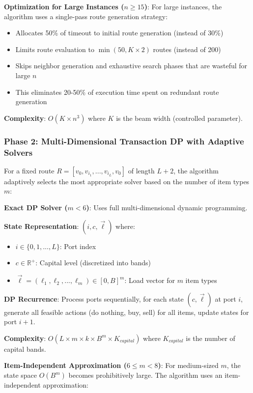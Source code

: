 \documentclass[12pt]{article}
\begin{document}
\textbf{Optimization for Large Instances ($n \geq 15$)}: For large instances, the algorithm uses a single-pass route generation strategy:
\begin{itemize}
    \item Allocates 50\% of timeout to initial route generation (instead of 30\%)
    \item Limits route evaluation to $\min(50, K \times 2)$ routes (instead of 200)
    \item Skips neighbor generation and exhaustive search phases that are wasteful for large $n$
    \item This eliminates 20-50\% of execution time spent on redundant route generation
\end{itemize}

\textbf{Complexity}: $O(K \times n^3)$ where $K$ is the beam width (controlled parameter).

\subsubsection{Phase 2: Multi-Dimensional Transaction DP with Adaptive Solvers}

For a fixed route $R = [v_0, v_{i_1}, ..., v_{i_L}, v_0]$ of length $L+2$, the algorithm adaptively selects the most appropriate solver based on the number of item types $m$:

\textbf{Exact DP Solver ($m < 6$)}: Uses full multi-dimensional dynamic programming.

\textbf{State Representation}: $(i, c, \vec{\ell})$ where:
\begin{itemize}
    \item $i \in \{0, 1, ..., L\}$: Port index
    \item $c \in \mathbb{R}^+$: Capital level (discretized into bands)
    \item $\vec{\ell} = (\ell_1, \ell_2, ..., \ell_m) \in [0, B]^m$: Load vector for $m$ item types
\end{itemize}

\textbf{DP Recurrence}: Process ports sequentially, for each state $(c, \vec{\ell})$ at port $i$, generate all feasible actions (do nothing, buy, sell) for all items, update states for port $i+1$.

\textbf{Complexity}: $O(L \times m \times k \times B^m \times K_{capital})$ where $K_{capital}$ is the number of capital bands.

\textbf{Item-Independent Approximation ($6 \leq m < 8$)}: For medium-sized $m$, the state space $O(B^m)$ becomes prohibitively large. The algorithm uses an item-independent approximation:
\end{document}
